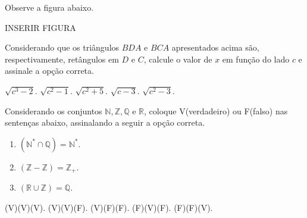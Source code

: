 \begin{question}%
Observe a figura abaixo.

INSERIR FIGURA

Considerando que os triângulos \(BDA\) e \(BCA\) apresentados acima são, respectivamente, retângulos em \(D\) e \(C\), calcule o valor de \(x\) em função do lado \(c\) e assinale a opção correta.
    \begin{tasks}
        \task \(\sqrt{c^3 - 2}\).
        \task \(\sqrt{c^2 - 1}\). 
        \task \(\sqrt{c^2 + 5}\).
        \task \(\sqrt{c - 3}\).
        \task \(\sqrt{c^2 -3}\).
    \end{tasks}
\end{question}

\begin{question}%
Considerando os conjuntos \(\mathbb{N},\mathbb{Z},\mathbb{Q}\) e \(\mathbb{R}\), coloque V(verdadeiro) ou F(falso) nas sentenças abaixo, assinalando a seguir a opção correta.

\begin{enumerate}[label=(~~)]
    \item \( (\mathbb{N}^{*} \cap \mathbb{Q}) = \mathbb{N}^{*}\).
    \item \( (\mathbb{Z} - \mathbb{Z}) = \mathbb{Z_{+}}\).
    \item \( ( \mathbb{R} \cup \mathbb{Z}) = \mathbb{Q}\).
\end{enumerate}
    \begin{tasks}
        \task (V)(V)(V).
        \task (V)(V)(F).
        \task (V)(F)(F).
        \task (F)(V)(F).
        \task (F)(F)(V).
    \end{tasks}
\end{question}
